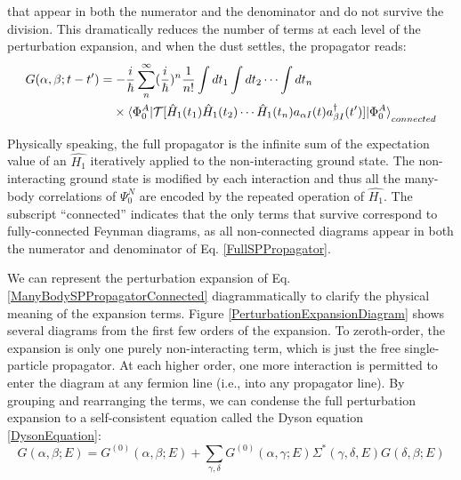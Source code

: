 that appear in both the numerator and the denominator and do not survive the
division. This dramatically
reduces the number of terms at each level of the perturbation expansion, and when the dust settles,
the propagator reads:
\begin{equation} \label{ManyBodySPPropagatorConnected}
    \begin{split}
    G(\alpha, \beta; t-t') & =
    -\frac{i}{\hbar}\sum^{\infty}_{n}(\frac{i}{\hbar})^{n}
    \frac{1}{n!}\int dt_{1} \int dt_{2} \cdots \int dt_{n}\\
    & \phantom{ {}= } \times \braket{\Phi^{A}_{0}|
    \mathcal{T}[\hat{H}_{1}(t_{1})
    \hat{H}_{1}(t_{2}) \cdots \hat{H}_{1}(t_{n})a_{{\alpha}I}(t)a^{\dagger}_{{\beta}I}(t')]|\Phi^{A}_{0}}_{connected}
\end{split}
\end{equation}

Physically speaking, the full propagator is the infinite sum of the expectation value of 
an $\hat{H_{1}}$ iteratively applied to the non-interacting ground state. The
non-interacting ground state is modified by each interaction and thus all the many-body correlations
of $\Psi^{N}_{0}$ are encoded by the repeated operation of $\hat{H_{1}}$. The subscript
``connected'' indicates that the only terms that survive correspond to fully-connected Feynman 
diagrams, as all non-connected diagrams appear in both the numerator and denominator of Eq. 
\ref{FullSPPropagator}.

We can represent the perturbation expansion of Eq. \ref{ManyBodySPPropagatorConnected}
diagrammatically to clarify the physical meaning of the expansion terms. Figure
\ref{PerturbationExpansionDiagram} shows several diagrams from the first few orders of the
expansion. To zeroth-order, 
the expansion is only one purely non-interacting term, which is just the free single-particle 
propagator. At each higher order, one more interaction is permitted to enter the diagram at any
fermion line (i.e., into any propagator line). By grouping and rearranging the terms, we can condense the full perturbation expansion to a
self-consistent equation called the Dyson equation \ref{DysonEquation}:
\begin{equation} \label{DysonEquation}
    G(\alpha,\beta;E) = G^{(0)}(\alpha,\beta;E) +
    \sum_{\gamma,\delta}G^{(0)}(\alpha,\gamma;E)\Sigma^{*}(\gamma,\delta,E)G(\delta, \beta; E)
\end{equation}

